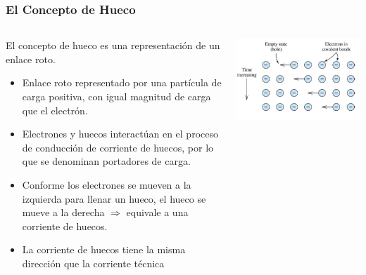 \documentclass[10pt,t,aspectratio=169]{beamer}
\begin{document}
\begin{frame}[t]
  \frametitle{El Concepto de Hueco}

  \begin{columns}
  
    \begin{column}[]{0.6\textwidth}
    
      El concepto de hueco es una representación de un enlace roto.

      \begin{itemize}
        \item Enlace roto representado por una partícula de carga positiva, con igual magnitud de carga que el electrón.
        \item Electrones y huecos interactúan en el proceso de conducción de corriente de huecos, por lo que se denominan portadores de carga.
        \item Conforme los electrones se mueven a la izquierda para llenar un hueco, el hueco se mueve a la derecha $\Rightarrow$ equivale a una corriente de huecos. 
        \item La corriente de huecos tiene la misma dirección que la corriente técnica
      \end{itemize}
      
    \end{column}
    
    \begin{column}[]{0.4\textwidth}
    
      \centering
      \includegraphics[width=\textwidth]{./figures/corriente-huecos.png}
      
    \end{column}
    
  \end{columns}
  
\end{frame}
\end{document}

